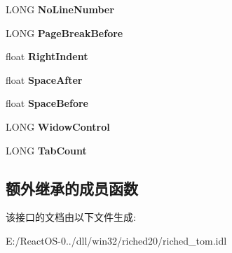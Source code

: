 \begin{DoxyCompactItemize}
\mbox{\label{interfacetom_1_1_i_text_para_ade4252fe7cf7b71e4b3a062f70e9ea30}} 
L\+O\+NG {\bfseries No\+Line\+Number}
\item 
\mbox{\label{interfacetom_1_1_i_text_para_a023a3a57e3e7fada42b9ab02fa909268}} 
L\+O\+NG {\bfseries Page\+Break\+Before}
\item 
\mbox{\label{interfacetom_1_1_i_text_para_ab28712dc7548931fc2217e09bc590c4d}} 
float {\bfseries Right\+Indent}
\item 
\mbox{\label{interfacetom_1_1_i_text_para_ac681eb2524bdc408b8ab20cc1663dfde}} 
float {\bfseries Space\+After}
\item 
\mbox{\label{interfacetom_1_1_i_text_para_a4694485564fb53731597ba686eb348cc}} 
float {\bfseries Space\+Before}
\item 
\mbox{\label{interfacetom_1_1_i_text_para_a7dcdc9c5ababbf2e381fe5b53fab3b28}} 
L\+O\+NG {\bfseries Widow\+Control}
\item 
\mbox{\label{interfacetom_1_1_i_text_para_a73556b61a54d96535f79a931c837eaf0}} 
L\+O\+NG {\bfseries Tab\+Count}
\end{DoxyCompactItemize}
\subsection*{额外继承的成员函数}


该接口的文档由以下文件生成\+:\begin{DoxyCompactItemize}
\item 
E\+:/\+React\+O\+S-\/0../dll/win32/riched20/riched\+\_\+tom.\+idl\end{DoxyCompactItemize}

